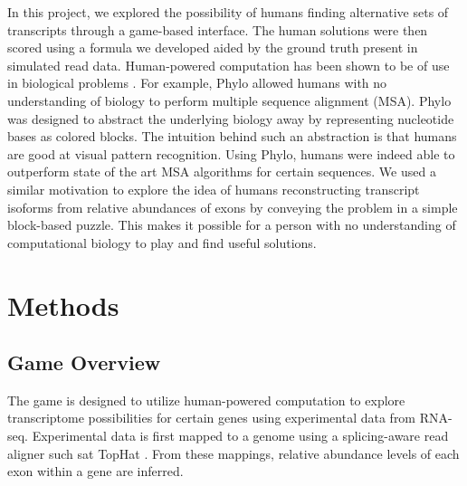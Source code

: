 \documentclass[12pt]{article}
\begin{document}
In this project, we explored the possibility of humans finding alternative sets of transcripts through a game-based interface. The human solutions were then scored using a formula we developed aided by the ground truth present in simulated read data. Human-powered computation has been shown to be of use in biological problems \citep{kawrykow2012phylo, cooper2010predicting}. For example, Phylo allowed humans with no understanding of biology to perform multiple sequence alignment (MSA). Phylo was designed to abstract the underlying biology away by representing nucleotide bases as colored blocks.  The intuition behind such an abstraction is that humans are good at visual pattern recognition. Using Phylo, humans were indeed able to outperform state of the art MSA algorithms for certain sequences. We used a similar motivation to explore the idea of humans reconstructing transcript isoforms from relative abundances of exons by conveying the problem in a simple block-based puzzle. This makes it possible for a person with no understanding of computational biology to play and find useful solutions. 

\section*{Methods}

\subsection*{Game Overview}
The game is designed to utilize human-powered computation to explore transcriptome possibilities for certain genes using experimental data from
RNA-seq. Experimental data is first mapped to a genome using a splicing-aware read aligner such sat TopHat \citep{trapnell2009tophat}. From these mappings,
relative abundance levels of each exon within a gene are inferred.
\end{document}
